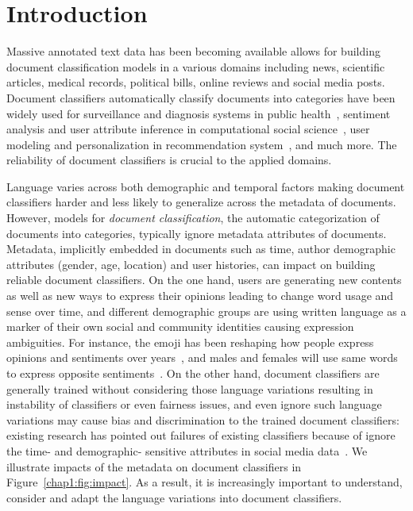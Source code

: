 \chapter{Introduction}
\label{chp:intro}
Massive annotated text data has been becoming available allows for building document classification models in a various domains including news, scientific articles, medical records, political bills, online reviews and social media posts.
Document classifiers automatically classify documents into categories have been widely used for surveillance and diagnosis systems in public health~\cite{lamb2013separating, de2016discovering, huang2019can, zhu2019detecting}, sentiment analysis and user attribute inference in computational social science~\cite{rosenthal2011age, yang2016hierarchical, huang2017exploring, heindorf2019debiasing}, user modeling and personalization in recommendation system~\cite{rao2010classifying, zhang2014explicit, zheng2014context, he2016ups}, and much more. 
The reliability of document classifiers is crucial to the applied domains.

Language varies across both demographic and temporal factors making document classifiers harder and less likely to generalize across the metadata of documents. 
However, models for \textit{document classification}, the automatic categorization of documents into categories, typically ignore metadata attributes of documents. 
Metadata, implicitly embedded in documents such as time, author demographic attributes (gender, age, location) and user histories, can impact on building reliable document classifiers.
On the one hand, users are generating new contents as well as new ways to express their opinions leading to change word usage and sense over time, and different demographic groups are using written language as a marker of their own social and community identities causing expression ambiguities.
For instance, the emoji has been reshaping how people express opinions and sentiments over years~\cite{felbo2017using}, and males and females will use same words to express opposite sentiments~\cite{volkova2013exploring}. %
On the other hand, document classifiers are generally trained without considering those language variations resulting in instability of classifiers or even fairness issues, and even ignore such language variations may cause bias and discrimination to the trained document classifiers: existing research has pointed out failures of existing classifiers because of ignore the time- and demographic- sensitive attributes in social media data~\cite{gayo2011limits, gayo2013predicting}.
We illustrate impacts of the metadata on document classifiers in Figure~\ref{chap1:fig:impact}.
As a result, it is increasingly important to understand, consider and adapt the language variations into document classifiers.

